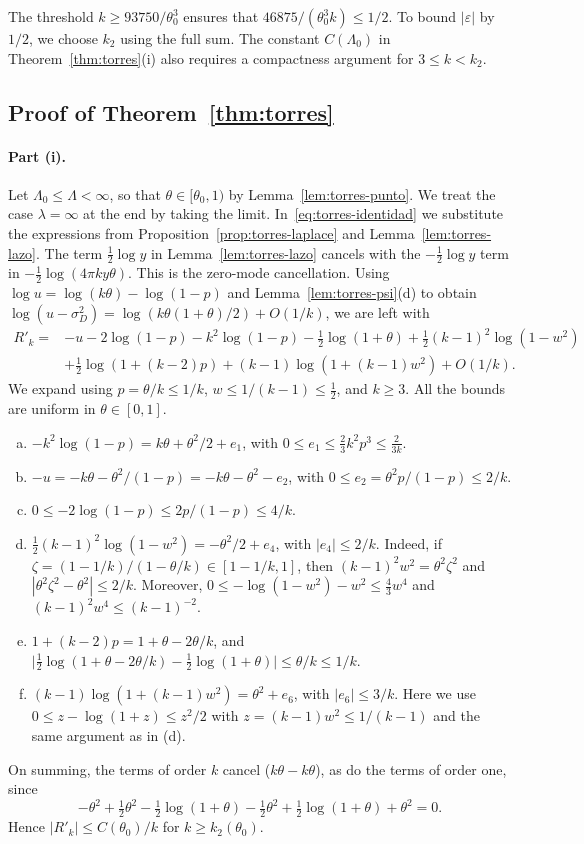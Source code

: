 The threshold $k\ge93750/\theta_0^3$ ensures that $46875/(\theta_0^3k)\le1/2$. To bound $|\varepsilon|$ by
$1/2$,
we choose $k_2$ using the full sum. The constant $C(\Lambda_0)$ in Theorem~\ref{thm:torres}(i)
also requires a compactness argument for $3\le k<k_2$.

\subsection{Proof of Theorem~\ref{thm:torres}}\label{sec:torres-i}

\paragraph{Part (i).}
Let $\Lambda_0\le\Lambda<\infty$, so that $\theta\in[\theta_0,1)$ by Lemma~\ref{lem:torres-punto}. We treat
the
case $\lambda=\infty$ at the end by taking the limit. In~\eqref{eq:torres-identidad} we substitute the
expressions from
Proposition~\ref{prop:torres-laplace} and Lemma~\ref{lem:torres-lazo}. The term $\frac12\log y$ in
Lemma~\ref{lem:torres-lazo} cancels with the $-\frac12\log y$ term in $-\frac12\log(4\pi ky\theta)$. This is
the
zero-mode cancellation. Using $\log u=\log(k\theta)-\log(1-p)$ and
Lemma~\ref{lem:torres-psi}(d) to obtain $\log(u-\sigma_D^2)=\log(k\theta(1+\theta)/2)+O(1/k)$, we are left
with
\[
\begin{aligned}
 R'_k={}&-u-2\log(1-p)-k^2\log(1-p)-\tfrac12\log(1+\theta)+\tfrac12(k-1)^2\log(1-w^2)\\
 &+\tfrac12\log(1+(k-2)p)+(k-1)\log(1+(k-1)w^2)+O(1/k).
\end{aligned}
\]
We expand using $p=\theta/k\le1/k$, $w\le1/(k-1)\le\frac12$, and $k\ge3$. All the bounds are
uniform in $\theta\in[0,1]$.
\begin{enumerate}[(a)]
\item $-k^2\log(1-p)=k\theta+\theta^2/2+e_1$, with $0\le e_1\le\frac23k^2p^3\le\frac2{3k}$.
\item $-u=-k\theta-\theta^2/(1-p)=-k\theta-\theta^2-e_2$, with $0\le e_2=\theta^2p/(1-p)\le2/k$.
\item $0\le-2\log(1-p)\le2p/(1-p)\le4/k$.
\item $\frac12(k-1)^2\log(1-w^2)=-\theta^2/2+e_4$, with $|e_4|\le2/k$. Indeed, if
 $\zeta=(1-1/k)/(1-\theta/k)\in[1-1/k,1]$, then $(k-1)^2w^2=\theta^2\zeta^2$ and
 $|\theta^2\zeta^2-\theta^2|\le2/k$. Moreover, $0\le-\log(1-w^2)-w^2\le\frac43w^4$ and
$(k-1)^2w^4\le(k-1)^{-2}$.
\item $1+(k-2)p=1+\theta-2\theta/k$, and
 $\bigl|\frac12\log(1+\theta-2\theta/k)-\frac12\log(1+\theta)\bigr|\le\theta/k\le1/k$.
\item $(k-1)\log(1+(k-1)w^2)=\theta^2+e_6$, with $|e_6|\le3/k$. Here we use $0\le z-\log(1+z)\le z^2/2$ with
 $z=(k-1)w^2\le1/(k-1)$ and the same argument as in (d).
\end{enumerate}
On summing, the terms of order $k$ cancel ($k\theta-k\theta$), as do the terms of order one, since
\[
 -\theta^2+\tfrac12\theta^2-\tfrac12\log(1+\theta)-\tfrac12\theta^2+\tfrac12\log(1+\theta)+\theta^2=0.
\]
Hence $|R'_k|\le C(\theta_0)/k$ for $k\ge k_2(\theta_0)$.

